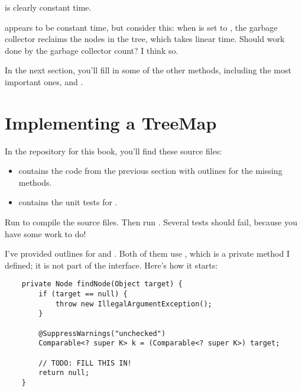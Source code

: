 \documentclass[12pt]{book}
\theoremstyle{exercise}
\begin{document}
 is clearly constant time.


 appears to be constant time, but consider this: when
 is set to , the garbage collector reclaims
the nodes in the tree, which takes linear time. Should work done by the
garbage collector count? I think so.


In the next section, you'll fill in some of the other methods, including
the most important ones,  and .

\section{Implementing a TreeMap}


In the repository for this book, you'll find these source files:

\begin{itemize}

\item
   contains the code from the previous section
  with outlines for the missing methods.

\item
   contains the unit tests for
  .

\end{itemize}

Run  to compile the source files. Then run .  Several tests should fail, because you have some
work to do!


I've provided outlines for  and .  Both of
them use , which is a private method I defined; it is
not part of the  interface. Here's how it starts:

\begin{verbatim}
    private Node findNode(Object target) {
        if (target == null) {
            throw new IllegalArgumentException();
        }

        @SuppressWarnings("unchecked")
        Comparable<? super K> k = (Comparable<? super K>) target;

        // TODO: FILL THIS IN!
        return null;
    }
\end{verbatim}
\end{document}
